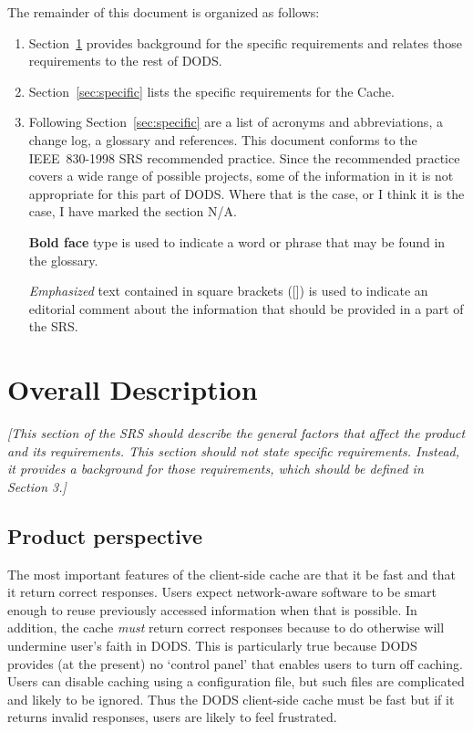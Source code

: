 \documentclass{article}
\begin{document}
The remainder of this document is organized as follows:
\begin{enumerate}
\item Section~\ref{sec:overall} provides background for the specific
requirements and relates those requirements to the rest of DODS.
\item Section~\ref{sec:specific} lists the specific requirements for the
  Cache.
\item Following Section~\ref{sec:specific} are a list of acronyms and
  abbreviations, a change log, a glossary and references.
This document conforms to the IEEE~830-1998 \ac{SRS} recommended practice.
Since the recommended practice covers a wide range of possible projects, some
of the information in it is not appropriate for this part of \acs{DODS}.
Where that is the case, or I think it is the case, I have marked the section
N/A.

\textbf{Bold face} type is used to indicate a word or phrase that may be
found in the glossary.

\emph{Emphasized} text contained in square brackets ([]) is used to indicate
an editorial comment about the information that should be provided in a part
of the \ac{SRS}.

\end{enumerate}


\section{Overall Description}
\label{sec:overall}

\emph{[This section of the SRS should describe the general factors that
  affect the product and its requirements. This section should not state
  specific requirements. Instead, it provides a background for those
  requirements, which should be defined in Section 3.]}

\subsection{Product perspective}

The most important features of the client-side cache are that it be fast and
that it return correct responses. Users expect network-aware software to be
smart enough to reuse previously accessed information when that is possible.
In addition, the cache \emph{must} return correct responses because to do
otherwise will undermine user's faith in DODS. This is particularly true
because DODS provides (at the present) no `control panel' that enables users
to turn off caching. Users can disable caching using a configuration file,
but such files are complicated and likely to be ignored. Thus the DODS
client-side cache must be fast but if it returns invalid responses, users are
likely to feel frustrated.
\end{document}
